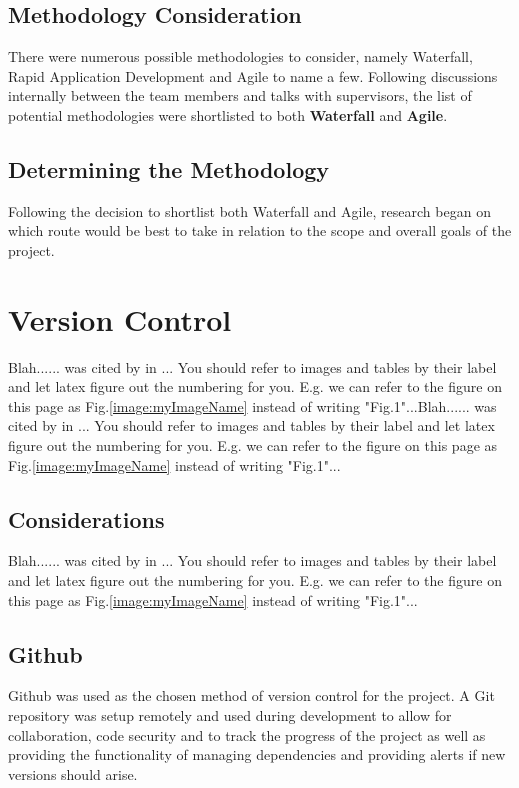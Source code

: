 \subsection{Methodology Consideration}
There were numerous possible methodologies to consider, namely Waterfall, Rapid Application Development and Agile to name a few. Following discussions internally between the team members and talks with supervisors, the list of potential methodologies were shortlisted to both \textbf{Waterfall} and \textbf{Agile}.

\subsection{Determining the Methodology}
Following the decision to shortlist both Waterfall and Agile, research began on which route would be best to take in relation to the scope and overall goals of the project.

\section{Version Control}
Blah...... was cited by \cite{MEAN_STACK} in ... You should refer to images and tables by their label and let latex figure out the numbering for you. E.g. we can refer to the figure on this page as Fig.\ref{image:myImageName} instead of writing "Fig.1"...Blah...... was cited by \cite{MEAN_STACK} in ... You should refer to images and tables by their label and let latex figure out the numbering for you. E.g. we can refer to the figure on this page as Fig.\ref{image:myImageName} instead of writing "Fig.1"...
\subsection{Considerations}
Blah...... was cited by \cite{MEAN_STACK} in ... You should refer to images and tables by their label and let latex figure out the numbering for you. E.g. we can refer to the figure on this page as Fig.\ref{image:myImageName} instead of writing "Fig.1"...

\subsection{Github}

Github was used as the chosen method of version control for the project. A Git repository was setup remotely and used during development to allow for collaboration, code security and to track the progress of the project as well as providing the functionality of managing dependencies and providing alerts if new versions should arise. 




